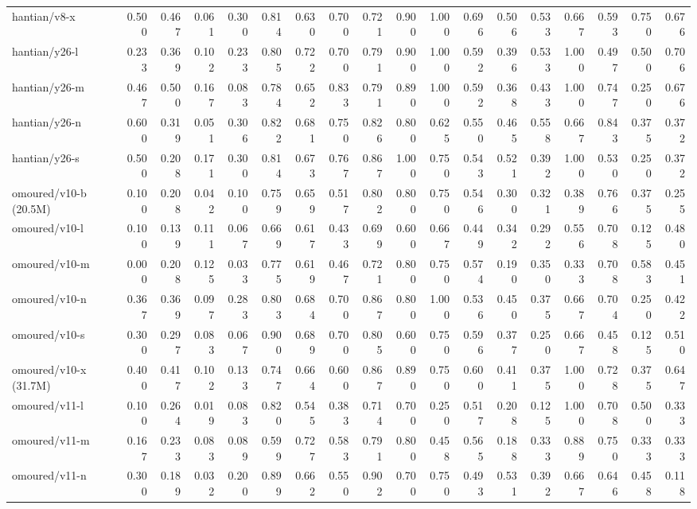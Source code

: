 \documentclass[border=2pt]{standalone}
\begin{document}
\begin{tabular}{lrrrrrrrrrrrrrrrrr}
hantian/v8-x & 0.500 & 0.467 & 0.061 & 0.300 & 0.814 & 0.630 & 0.700 & 0.721 & 0.900 & 1.000 & 0.696 & 0.506 & 0.533 & 0.667 & 0.593 & 0.750 & 0.676 \\
hantian/y26-l & 0.233 & 0.369 & 0.102 & 0.233 & 0.805 & 0.722 & 0.700 & 0.791 & 0.900 & 1.000 & 0.592 & 0.396 & 0.533 & 1.000 & 0.497 & 0.500 & 0.706 \\
hantian/y26-m & 0.467 & 0.500 & 0.167 & 0.083 & 0.784 & 0.652 & 0.833 & 0.791 & 0.890 & 1.000 & 0.592 & 0.368 & 0.433 & 1.000 & 0.747 & 0.250 & 0.676 \\
hantian/y26-n & 0.600 & 0.319 & 0.051 & 0.306 & 0.822 & 0.681 & 0.750 & 0.826 & 0.800 & 0.625 & 0.550 & 0.465 & 0.558 & 0.667 & 0.843 & 0.375 & 0.372 \\
hantian/y26-s & 0.500 & 0.208 & 0.171 & 0.300 & 0.814 & 0.673 & 0.767 & 0.867 & 1.000 & 0.750 & 0.543 & 0.521 & 0.392 & 1.000 & 0.530 & 0.250 & 0.372 \\
omoured/v10-b (20.5M) & 0.100 & 0.208 & 0.042 & 0.100 & 0.759 & 0.659 & 0.517 & 0.802 & 0.800 & 0.750 & 0.546 & 0.300 & 0.321 & 0.389 & 0.766 & 0.375 & 0.255 \\
omoured/v10-l & 0.100 & 0.139 & 0.111 & 0.067 & 0.669 & 0.617 & 0.433 & 0.699 & 0.600 & 0.667 & 0.449 & 0.342 & 0.292 & 0.556 & 0.708 & 0.125 & 0.480 \\
omoured/v10-m & 0.000 & 0.208 & 0.125 & 0.033 & 0.775 & 0.619 & 0.467 & 0.721 & 0.800 & 0.750 & 0.574 & 0.190 & 0.350 & 0.333 & 0.708 & 0.583 & 0.451 \\
omoured/v10-n & 0.367 & 0.369 & 0.097 & 0.283 & 0.803 & 0.684 & 0.700 & 0.867 & 0.800 & 1.000 & 0.536 & 0.450 & 0.375 & 0.667 & 0.704 & 0.250 & 0.422 \\
omoured/v10-s & 0.300 & 0.297 & 0.083 & 0.067 & 0.900 & 0.689 & 0.700 & 0.805 & 0.600 & 0.750 & 0.596 & 0.377 & 0.250 & 0.667 & 0.458 & 0.125 & 0.510 \\
omoured/v10-x (31.7M) & 0.400 & 0.417 & 0.102 & 0.133 & 0.747 & 0.664 & 0.600 & 0.867 & 0.890 & 0.750 & 0.600 & 0.411 & 0.375 & 1.000 & 0.728 & 0.375 & 0.647 \\
omoured/v11-l & 0.100 & 0.264 & 0.019 & 0.083 & 0.820 & 0.545 & 0.383 & 0.714 & 0.700 & 0.250 & 0.517 & 0.208 & 0.125 & 1.000 & 0.708 & 0.500 & 0.333 \\
omoured/v11-m & 0.167 & 0.233 & 0.083 & 0.089 & 0.599 & 0.727 & 0.583 & 0.791 & 0.800 & 0.458 & 0.565 & 0.188 & 0.333 & 0.889 & 0.750 & 0.333 & 0.333 \\
omoured/v11-n & 0.300 & 0.189 & 0.032 & 0.200 & 0.899 & 0.662 & 0.550 & 0.902 & 0.700 & 0.750 & 0.493 & 0.531 & 0.392 & 0.667 & 0.646 & 0.458 & 0.118 \\

\end{tabular}
\end{document}
